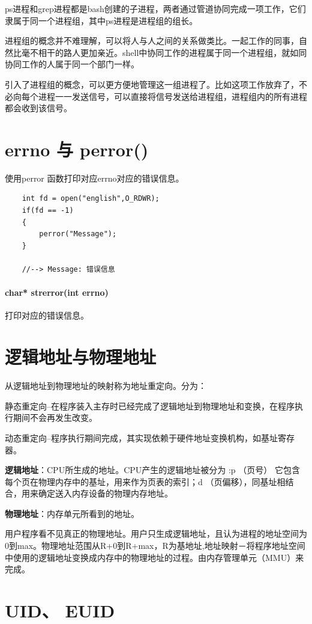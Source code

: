 \documentclass[UTF8,a4paper,12pt]{ctexbook}
\begin{document}
			 ps进程和grep进程都是bash创建的子进程，两者通过管道协同完成一项工作，它们隶属于同一个进程组，其中ps进程是进程组的组长。
			 
			 进程组的概念并不难理解，可以将人与人之间的关系做类比。一起工作的同事，自然比毫不相干的路人更加亲近。shell中协同工作的进程属于同一个进程组，就如同协同工作的人属于同一个部门一样。
			 
			 引入了进程组的概念，可以更方便地管理这一组进程了。比如这项工作放弃了，不必向每个进程一一发送信号，可以直接将信号发送给进程组，进程组内的所有进程都会收到该信号。
			 
	\section{errno 与 perror()}
		使用perror 函数打印对应errno对应的错误信息。
	
		\begin{lstlisting}
	int fd = open("english",O_RDWR);
	if(fd == -1)
	{
		perror("Message");
	}
	
	//--> Message: 错误信息
		\end{lstlisting}
		
		\paragraph{char* strerror(int errno)}打印对应的错误信息。
	
	\section{逻辑地址与物理地址}
		从逻辑地址到物理地址的映射称为地址重定向。分为：
				
		静态重定向--在程序装入主存时已经完成了逻辑地址到物理地址和变换，在程序执行期间不会再发生改变。
				
		动态重定向--程序执行期间完成，其实现依赖于硬件地址变换机构，如基址寄存器。
				
		\textbf{逻辑地址}：CPU所生成的地址。CPU产生的逻辑地址被分为 :p （页号） 它包含每个页在物理内存中的基址，用来作为页表的索引；d （页偏移），同基址相结合，用来确定送入内存设备的物理内存地址。
				
		\textbf{物理地址}：内存单元所看到的地址。
		
		用户程序看不见真正的物理地址。用户只生成逻辑地址，且认为进程的地址空间为0到max。物理地址范围从R+0到R+max，R为基地址,地址映射－将程序地址空间中使用的逻辑地址变换成内存中的物理地址的过程。由内存管理单元（MMU）来完成。
		
	\section{UID、 EUID}
	
\end{document}
